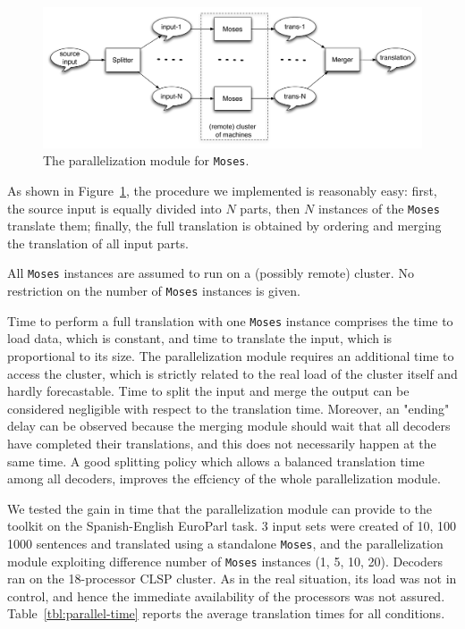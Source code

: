 \documentclass[10pt]{report}
\theoremstyle{plain}
\begin{document}
{\begin{figure}
\begin{center}
 \includegraphics[width=\columnwidth]{Moses-parallel}
\caption{The parallelization module for {\tt Moses}.}
\label{fig:parallel}
\end{center}
 \end{figure}
 
As shown in Figure~\ref{fig:parallel}, the procedure we implemented is reasonably easy:
first, the source input is equally divided into $N$ parts, then $N$ instances of the {\tt Moses} translate them; finally, the full translation is obtained by ordering and merging the translation of all input parts.

All {\tt Moses} instances are assumed to run on a (possibly remote) cluster. No restriction on the number of {\tt Moses} instances is given.


Time to perform a full translation with one {\tt Moses} instance comprises the time to load data, which is constant, and time to translate the input, which is proportional to its size.
The parallelization module requires an additional time to access the cluster, which is strictly related to the real load of the cluster itself and hardly forecastable.
Time to split the input and merge the output can be considered negligible with respect to the translation time.
Moreover, an "ending" delay can be observed because the merging module should wait that all decoders have completed their translations, and this does not necessarily happen at the same time. A good splitting policy which allows a balanced translation time among all decoders,  improves the effciency of the whole parallelization module.

We tested the gain in time that  the parallelization module can provide to the toolkit on the Spanish-English EuroParl task. 3 input sets were created of 10, 100 1000 sentences and translated using a standalone  {\tt Moses}, and the parallelization module exploiting difference number of {\tt Moses} instances (1, 5, 10, 20).
Decoders ran on the 18-processor CLSP cluster. As in the real situation, its load was not in control, and hence the immediate availability of the processors was not assured. Table~\ref{tbl:parallel-time} reports the average translation times for all conditions.

}
\end{document}
